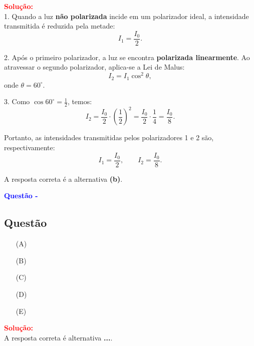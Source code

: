 \begin{flushleft}
\textcolor{red}{\textbf{Solução:}}\\

1. Quando a luz \textbf{n\~ao polarizada} incide em um polarizador ideal, a intensidade transmitida é reduzida pela metade:
\[
I_1 = \frac{I_0}{2}.
\]

2. Ap\'os o primeiro polarizador, a luz se encontra \textbf{polarizada linearmente}. Ao atravessar o segundo polarizador, aplica-se a Lei de Malus:
\[
I_2 = I_1 \cos^2\theta,
\]
onde \(\theta=60^\circ\).

3. Como \(\cos 60^\circ = \tfrac{1}{2}\), temos:
\[
I_2 = \frac{I_0}{2} \cdot \left(\frac{1}{2}\right)^2 
= \frac{I_0}{2} \cdot \frac{1}{4} 
= \frac{I_0}{8}.
\]

Portanto, as intensidades transmitidas pelos polarizadores 1 e 2 são, respectivamente:
\[
I_1 = \frac{I_0}{2}, 
\qquad 
I_2 = \frac{I_0}{8}.
\]

\vspace{0.3cm}

A resposta correta é a alternativa \colorbox{green!50}{\textbf{(b)}}.

\end{flushleft}



\begin{flushleft}
\textbf{\textcolor{blue}{\Large Quest\~ao - }}\\
\noindent

\subsection{Quest\~ao }

\begin{itemize}
\item[(A)] 
\item[(B)] 
\item[(C)]
\item[(D)] 
\item[(E)] 
\end{itemize}

\vspace{0.5cm}

\textcolor{red}{\textbf{Solução:}}\\


A resposta correta é alternativa \colorbox{green!50}{\textbf{...}}.

\end{flushleft}